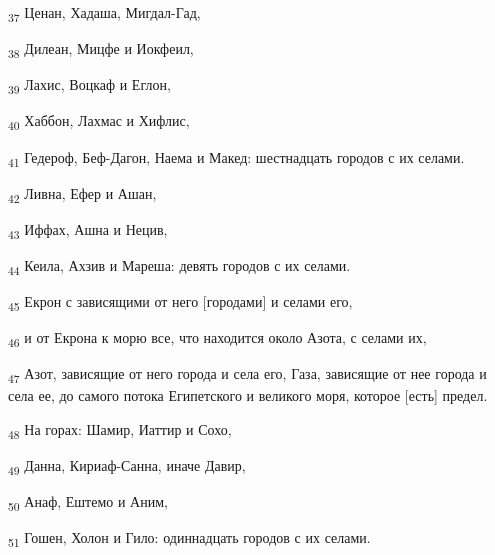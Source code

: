 \begin{tcolorbox}
\textsubscript{37} Ценан, Хадаша, Мигдал-Гад,
\end{tcolorbox}
\begin{tcolorbox}
\textsubscript{38} Дилеан, Мицфе и Иокфеил,
\end{tcolorbox}
\begin{tcolorbox}
\textsubscript{39} Лахис, Воцкаф и Еглон,
\end{tcolorbox}
\begin{tcolorbox}
\textsubscript{40} Хаббон, Лахмас и Хифлис,
\end{tcolorbox}
\begin{tcolorbox}
\textsubscript{41} Гедероф, Беф-Дагон, Наема и Макед: шестнадцать городов с их селами.
\end{tcolorbox}
\begin{tcolorbox}
\textsubscript{42} Ливна, Ефер и Ашан,
\end{tcolorbox}
\begin{tcolorbox}
\textsubscript{43} Иффах, Ашна и Нецив,
\end{tcolorbox}
\begin{tcolorbox}
\textsubscript{44} Кеила, Ахзив и Мареша: девять городов с их селами.
\end{tcolorbox}
\begin{tcolorbox}
\textsubscript{45} Екрон с зависящими от него [городами] и селами его,
\end{tcolorbox}
\begin{tcolorbox}
\textsubscript{46} и от Екрона к морю все, что находится около Азота, с селами их,
\end{tcolorbox}
\begin{tcolorbox}
\textsubscript{47} Азот, зависящие от него города и села его, Газа, зависящие от нее города и села ее, до самого потока Египетского и великого моря, которое [есть] предел.
\end{tcolorbox}
\begin{tcolorbox}
\textsubscript{48} На горах: Шамир, Иаттир и Сохо,
\end{tcolorbox}
\begin{tcolorbox}
\textsubscript{49} Данна, Кириаф-Санна, иначе Давир,
\end{tcolorbox}
\begin{tcolorbox}
\textsubscript{50} Анаф, Ештемо и Аним,
\end{tcolorbox}
\begin{tcolorbox}
\textsubscript{51} Гошен, Холон и Гило: одиннадцать городов с их селами.
\end{tcolorbox}
